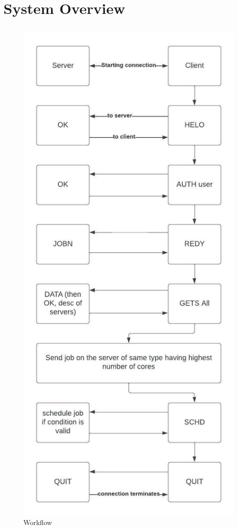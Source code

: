 \documentclass[a4paper]{article} %
\begin{document}
\section{System Overview}
\label{sec:section2}

\subsection{}\begin{figure}
    \centering
    \includegraphics{Pictures/diagram2.jpeg}
    \caption{Workflow}
    \label{fig:my_label}
\end{figure}
\end{document}
